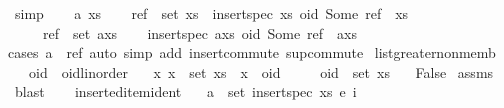 \begin{isabellebody}
\ simp\isanewline
{}\isamarkupfalse%
\isanewline
\ \ \isamarkupfalse%
\ a\ xs\isanewline
\ \ \isamarkupfalse%
\ {\isachardoublequoteopen}ref\ {\isasymnotin}\ set\ xs\ {\isasymLongrightarrow}\ insert{\isacharunderscore}spec\ xs\ {\isacharparenleft}oid{\isacharcomma}\ Some\ ref{\isacharparenright}\ {\isacharequal}\ xs{\isachardoublequoteclose}\isanewline
\ \ \ \ \ {\isachardoublequoteopen}ref\ {\isasymnotin}\ set\ {\isacharparenleft}a{\isacharhash}xs{\isacharparenright}{\isachardoublequoteclose}\isanewline
\ \ \isamarkupfalse%
\ {\isachardoublequoteopen}insert{\isacharunderscore}spec\ {\isacharparenleft}a{\isacharhash}xs{\isacharparenright}\ {\isacharparenleft}oid{\isacharcomma}\ Some\ ref{\isacharparenright}\ {\isacharequal}\ a{\isacharhash}xs{\isachardoublequoteclose}\isanewline
\ \ \ \ \isamarkupfalse%
{\isacharparenleft}cases\ {\isachardoublequoteopen}a\ {\isacharequal}\ ref{\isachardoublequoteclose}{\isacharcomma}\ auto\ simp\ add{\isacharcolon}\ insert{\isacharunderscore}commute\ sup{\isacharunderscore}commute{\isacharparenright}\isanewline
{}\isamarkupfalse%
%
\endisatagproof
{\isafoldproof}%
%
\isadelimproof
\isanewline
%
\endisadelimproof
\isanewline
{}\isamarkupfalse%
\ list{\isacharunderscore}greater{\isacharunderscore}non{\isacharunderscore}memb{\isacharcolon}\isanewline
\ \ \ oid\ {\isacharcolon}{\isacharcolon}\ {\isachardoublequoteopen}{\isacharprime}oid{\isacharcolon}{\isacharcolon}{\isacharbraceleft}linorder{\isacharbraceright}{\isachardoublequoteclose}\isanewline
\ \ \ {\isachardoublequoteopen}{\isasymAnd}x{\isachardot}\ x\ {\isasymin}\ set\ xs\ {\isasymLongrightarrow}\ x\ {\isacharless}\ oid{\isachardoublequoteclose}\isanewline
\ \ \ \ \ {\isachardoublequoteopen}oid\ {\isasymin}\ set\ xs{\isachardoublequoteclose}\isanewline
\ \ \ {\isachardoublequoteopen}False{\isachardoublequoteclose}\isanewline
%
\isadelimproof
%
\endisadelimproof
%
\isatagproof
{}\isamarkupfalse%
\ assms\ \isamarkupfalse%
\ blast%
\endisatagproof
{\isafoldproof}%
%
\isadelimproof
\ \ \isanewline
%
\endisadelimproof
\isanewline
{}\isamarkupfalse%
\ inserted{\isacharunderscore}item{\isacharunderscore}ident{\isacharcolon}\isanewline
\ \ \ {\isachardoublequoteopen}a\ {\isasymin}\ set\ {\isacharparenleft}insert{\isacharunderscore}spec\ xs\ {\isacharparenleft}e{\isacharcomma}\ i{\isacharparenright}{\isacharparenright}{\isachardoublequoteclose}\isanewline

\end{isabellebody}
